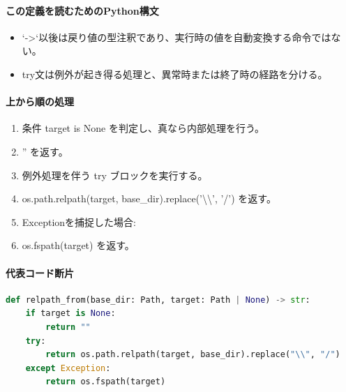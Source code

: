 \documentclass[a4paper,11pt]{article}
\begin{document}
            \paragraph{この定義を読むためのPython構文}
            \begin{itemize}[leftmargin=1.6em]
            \item `->`以後は戻り値の型注釈であり、実行時の値を自動変換する命令ではない。
\item try文は例外が起き得る処理と、異常時または終了時の経路を分ける。
            \end{itemize}
            \paragraph{上から順の処理}
            \begin{enumerate}[leftmargin=1.8em]
            \item 条件 target is None を判定し、真なら内部処理を行う。
\item   '' を返す。
\item 例外処理を伴う try ブロックを実行する。
\item   os.path.relpath(target, base\_dir).replace('\textbackslash{}\textbackslash{}', '/') を返す。
\item   Exceptionを捕捉した場合:
\item   os.fspath(target) を返す。
            \end{enumerate}
            \paragraph{代表コード断片}
            \begin{lstlisting}[language=Python]
def relpath_from(base_dir: Path, target: Path | None) -> str:
    if target is None:
        return ""
    try:
        return os.path.relpath(target, base_dir).replace("\\", "/")
    except Exception:
        return os.fspath(target)
\end{lstlisting}
\end{document}
